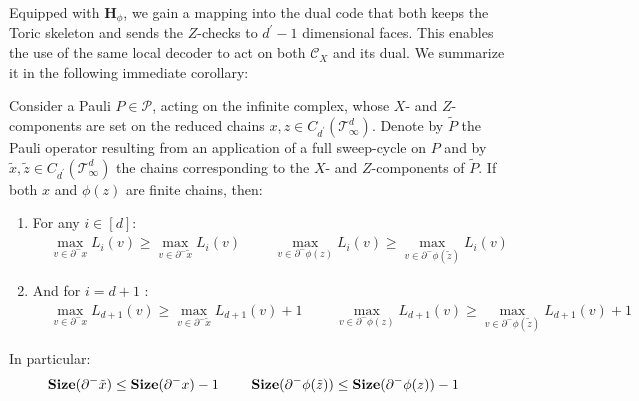 Equipped with $\mathbf{H}_{\phi}$, we gain a mapping into the dual code that both keeps the Toric skeleton and sends the $Z$-checks to $d^{\prime}-1$ dimensional faces. This enables the use of the same local decoder to act on both $\mathcal{C}_{X}$ and its dual. We summarize it in the following immediate corollary:
\begin{corollary}
\label{claim:polesmove}  
Consider a Pauli $P \in \mathcal{P}$, acting on the infinite complex, whose $X$- and $Z$-components are set on the reduced chains $x, z \in C_{d^{\prime}}(\mathcal T_\infty^d)$. Denote by $\tilde{P}$ the Pauli operator resulting from an application of a full sweep-cycle on $P$ and by $\tilde{x}, \tilde{z} \in C_{d^{\prime}}(\mathcal T_\infty^d)$ the chains corresponding to the $X$- and $Z$-components of $\tilde{P}$. If both $x$ and $\phi(z)$ are finite chains, then:
  \begin{enumerate}
    \item For any $i \in [d]$: 
      \begin{equation*}
        \begin{split}
          & \max_{v \in \partial^{-} x} L_{i}(v)  \ge \max_{v \in \partial^{-} \tilde{x}} L_{i}(v) \, \quad \quad \, \max_{v \in \partial^{-} \phi(z)} L_{i}(v)  \ge \max_{v \in \partial^{-} \phi(\tilde{z}) } L_{i}(v) 
      \end{split}
      \end{equation*}
    \item And for $i = d+1$ : 
      \begin{equation*}
        \begin{split}
          & \max_{v \in \partial^{-} x} L_{d+1}(v)  \ge \max_{v \in \partial^{-} \tilde{x}} L_{d+1}(v) + 1 \, \quad \quad \,            \max_{v \in \partial^{-} \phi(z)} L_{d+1}(v)  \ge \max_{v \in \partial^{-} \phi(\tilde{z}) } L_{d+1}(v) + 1
        \end{split}
      \end{equation*}
  \end{enumerate}
  In particular: 
  \begin{equation*}
    \begin{split}
      &\mathbf{Size}( \partial^{-} \tilde{x})  \le \mathbf{Size}( \partial^{-} x)  - 1 \, \quad \quad \,   \mathbf{Size}( \partial^{-}\phi(\tilde{z} ) )  \le \mathbf{Size}( \partial^{-}\phi(z) ) - 1 
    \end{split}
  \end{equation*}
\end{corollary}



